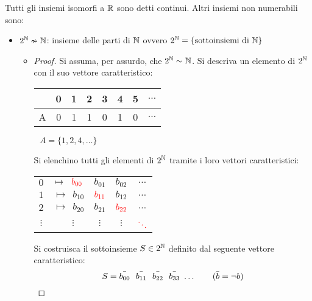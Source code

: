 Tutti gli insiemi isomorfi a $\mathbb{R}$ sono detti continui. Altri insiemi non numerabili sono:
\begin{itemize}
    \item $2^{\mathbb{N}}\nsim\mathbb{N}$: insieme delle parti di $\mathbb{N}$ ovvero 
        $2^{\mathbb{N}} = \{\text{sottoinsiemi di } \mathbb{N}\}$
        \begin{itemize}
            \item[]\begin{proof}
                Si assuma, per assurdo, che $2^{\mathbb{N}}\sim\mathbb{N}$. Si descriva un elemento di $2^{\mathbb{N}}$ con
                il suo vettore caratteristico:
                \begin{center}
                    \begin{tabular}{c|ccccccc}
                        \N & 0 & 1 & 2 & 3 & 4 & 5 & $\dots$ \\ \hline
                         A & 0 & 1 & 1 & 0 & 1 & 0 & $\dots$ 
                    \end{tabular}
                    $\ \ \ A=\{1,2,4,\dots\}$
                \end{center}
                Si elenchino tutti gli elementi di $2^{\mathbb{N}}$ tramite i loro vettori caratteristici:

                \begin{minipage}{.40\textwidth}
                    \begin{tabular}{ccccc}
                    $0$ & $\mapsto \ \ {\color{red}b_{00}}$ & $b_{01}$ & $b_{02}$ & $\dots$ \\
                    $1$ & $\mapsto \ \ b_{10}$ & ${\color{red}b_{11}}$ & $b_{12}$ & $\dots$ \\
                    $2$ & $\mapsto \ \ b_{20}$ & $b_{21}$ & ${\color{red}b_{22}}$ & $\dots$ \\
                    $\vdots$&$\ \ \ \ \vdots$ & $\vdots$ & $\vdots$ & ${\color{red}\ddots}$
                    \end{tabular}
                \end{minipage}
                \begin{minipage}{.45\textwidth}
                    Si costruisca il sottoinsieme $S\in2^{\mathbb{N}}$ definito dal seguente vettore 
                    caratteristico:
                    \begin{equation}
                        S = \bar{b_{00}}\ \ \bar{b_{11}}\ \ \bar{b_{22}}\ \ \bar{b_{33}}\ \dots
                    \tag{$\bar{b}=\lnot b$}\end{equation}
                \end{minipage}


\end{proof}
\end{itemize}
\end{itemize}

